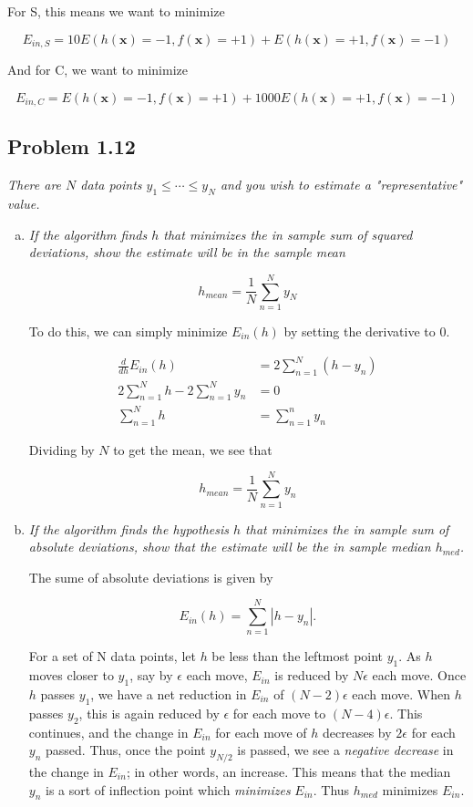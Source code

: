 \documentclass{article}
\renewcommand{\vec}[1]{\mathbf{#1}}
\begin{document}
For S, this means we want to minimize

$$E_{in, S} = 10E(h(\vec{x})=-1, f(\vec{x})=+1) + E(h(\vec{x})=+1, f(\vec{x})=-1)$$

And for C, we want to minimize

$$E_{in, C} = E(h(\vec{x})=-1, f(\vec{x})=+1) + 1000E(h(\vec{x})=+1, f(\vec{x})=-1)$$


\subsection*{Problem 1.12}

\textit{There are $N$ data points $y_1 \leq \cdots \leq y_N$ and you wish to estimate a "representative" value.}

\begin{enumerate}[(a)]
  \item \textit{If the algorithm finds $h$ that minimizes the in sample sum of squared deviations, show the estimate will be in the sample mean}

    $$h_{mean} = \frac{1}{N} \sum_{n=1}^{N}y_N$$

    To do this, we can simply minimize $E_{in}(h)$ by setting the derivative to 0.

    \begin{align*}
      \frac{d}{dh} E_{in}(h) &= 2\sum_{n=1}^N(h-y_n) \\
      2\sum_{n=1}^N h - 2\sum_{n=1}^N y_n &= 0 \\
      \sum_{n=1}^N h &= \sum_{n=1}^n y_n
    \end{align*}

    Dividing by $N$ to get the mean, we see that

    $$h_{mean} = \frac{1}{N} \sum_{n=1}^N y_n$$

  \item \textit{If the algorithm finds the hypothesis $h$ that minimizes the in sample sum of absolute deviations, show that the estimate will be the in sample median $h_{med}$.}

    The sume of absolute deviations is given by

    $$E_{in}(h) = \sum_{n=1}^N |h-y_n|.$$

    For a set of N data points, let $h$ be less than the leftmost point $y_1$. As $h$ moves
    closer to $y_1$, say by $\epsilon$ each move, $E_{in}$ is reduced by $N\epsilon$ each move.
    Once $h$ passes $y_1$, we have a net reduction in $E_{in}$ of $(N-2)\epsilon$ each move.
    When $h$ passes $y_2$, this is again reduced by $\epsilon$ for each move to $(N-4)\epsilon$.
    This continues, and the change in $E_{in}$ for each move of $h$ decreases by $2\epsilon$
    for each $y_n$ passed. Thus, once the point $y_{N/2}$ is passed, we see a \textit{negative
    decrease} in the change in $E_{in}$; in other words, an increase. This means that the median
    $y_n$ is a sort of inflection point which \textit{minimizes} $E_{in}$. Thus $h_{med}$
    minimizes $E_{in}$.


\end{enumerate}
\end{document}
